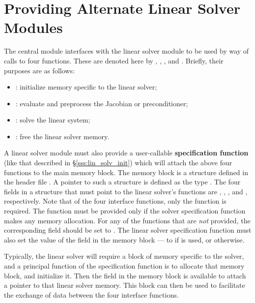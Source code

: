 \chapter{Providing Alternate Linear Solver Modules}\label{s:new_linsolv}
The central {\kinsol} module interfaces with the linear solver module 
to be used by way of calls to four functions.  These are denoted here by 
, , , and .
Briefly, their purposes are as follows:
\begin{itemize}
\item {}: initialize memory specific to the linear solver;
\item {}: evaluate and preprocess the Jacobian or preconditioner;
\item {}: solve the linear system;
\item {}: free the linear solver memory.
\end{itemize}
A linear solver module must also provide a user-callable {\bf specification function}
(like that described in \S\ref{sss:lin_solv_init}) which will
attach the above four functions to the main {\kinsol} memory block.
The {\kinsol} memory block is a structure defined in the header file
. A pointer to such a structure is defined as the
type . The four fields in a  structure that
must point to the linear solver's functions are ,
, , and , respectively.
Note that of the four interface functions, only the  function
is required. The  function must be provided only if the solver
specification function makes any memory allocation.
For any of the functions that are {\it not} provided, the
corresponding field should be set to .
The linear solver specification function must also set the value of
the field  in the {\kinsol} memory block --- to
 if  is used, or  otherwise.

Typically, the linear solver will require a block of memory specific
to the solver, and a principal function of the specification function
is to allocate that memory block, and initialize it.  Then the field
 in the {\kinsol} memory block is available to attach a
pointer to that linear solver memory.  This block can then be used
to facilitate the exchange of data between the four interface
functions.

